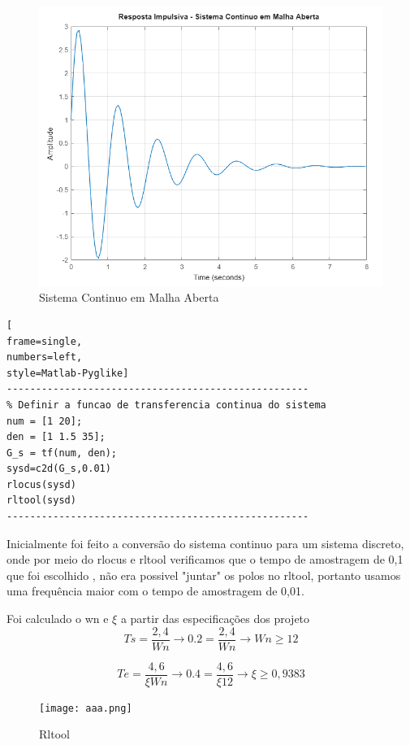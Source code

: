 \documentclass[a4paper, 12pt]{article}
\begin{document}
\begin{figure}[H]
    \centering
    \includegraphics[width=0.9\linewidth]{99.png}
    \caption{Sistema Continuo em Malha Aberta}
    \label{fig:enter-label}
\end{figure}
\begin{lstlisting}[
frame=single,
numbers=left,
style=Matlab-Pyglike]
----------------------------------------------------
% Definir a funcao de transferencia continua do sistema
num = [1 20];
den = [1 1.5 35];
G_s = tf(num, den);
sysd=c2d(G_s,0.01)
rlocus(sysd)
rltool(sysd)
----------------------------------------------------
\end{lstlisting}

    Inicialmente foi feito a conversão do sistema continuo para um sistema discreto, onde por meio do rlocus e rltool verificamos que o tempo de amostragem de 0,1 que foi escolhido , não era possivel "juntar" os polos no rltool, portanto usamos uma frequência maior com o tempo de amostragem de 0,01.

    Foi calculado o wn e \(\xi\) a partir das especificações dos projeto
    \begin{equation}
    Ts = \frac{2,4}{Wn} \rightarrow 0.2 = \frac{2,4}{Wn} \rightarrow Wn \geq 12
    \end{equation}

    \begin{equation}
    Te = \frac{4,6}{\xi Wn} \rightarrow 0.4 = \frac{4,6}{\xi 12} \rightarrow \xi \geq 0,9383
    \end{equation}
    
\begin{figure}[H]
    \centering
    \texttt{[image: aaa.png]}
    \caption{Rltool}
    \label{fig:enter-label}
\end{figure}
\end{document}
